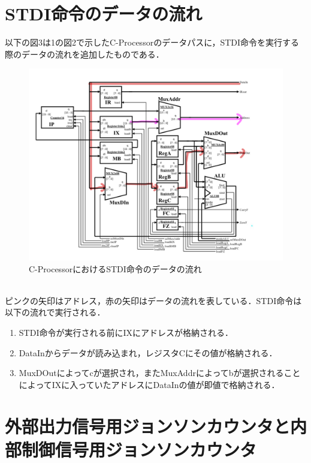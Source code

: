 \documentclass[dvipdfmx]{jarticle}
\begin{document}
\section{STDI命令のデータの流れ}
以下の図3は1の図2で示したC-Processorのデータパスに，STDI命令を実行する際のデータの流れを追加したものである．
\begin{figure}[h]
  \centering
  \includegraphics[width = 12cm]{STDI.png}
  \caption{C-ProcessorにおけるSTDI命令のデータの流れ}  
\end{figure}
\\ピンクの矢印はアドレス，赤の矢印はデータの流れを表している．STDI命令は以下の流れで実行される．
\begin{enumerate}
  \item STDI命令が実行される前にIXにアドレスが格納される．
  \item DataInからデータが読み込まれ，レジスタCにその値が格納される．
  \item MuxDOutによってcが選択され，またMuxAddrによってbが選択されることによってIXに入っていたアドレスにDataInの値が即値で格納される．
\end{enumerate}
\clearpage
\section{外部出力信号用ジョンソンカウンタと内部制御信号用ジョンソンカウンタ}
\end{document}
